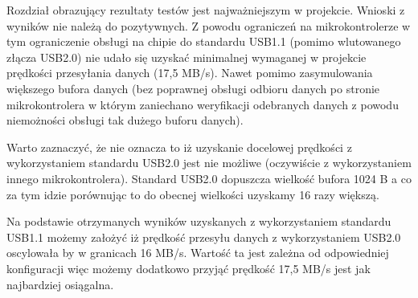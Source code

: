 \documentclass{BscUS}
\begin{document}
Rozdział obrazujący rezultaty testów jest najważniejszym w projekcie. Wnioski z wyników nie należą do pozytywnych. Z powodu ograniczeń na mikrokontrolerze w tym ograniczenie obsługi na chipie do standardu USB1.1 (pomimo wlutowanego złącza USB2.0) nie udało się uzyskać minimalnej wymaganej w projekcie prędkości przesyłania danych (17,5 MB/s). Nawet pomimo zasymulowania większego bufora danych (bez poprawnej obsługi odbioru danych po stronie mikrokontrolera w którym zaniechano weryfikacji odebranych danych z powodu niemożności obsługi tak dużego buforu danych).

Warto zaznaczyć, że nie oznacza to iż uzyskanie docelowej prędkości z wykorzystaniem standardu USB2.0 jest nie możliwe (oczywiście z wykorzystaniem innego mikrokontrolera). Standard USB2.0 dopuszcza wielkość bufora 1024 B a co za tym idzie porównując to do obecnej wielkości uzyskamy 16 razy większą.

Na podstawie otrzymanych wyników uzyskanych z wykorzystaniem standardu USB1.1 możemy założyć iż prędkość przesyłu danych z wykorzystaniem USB2.0 oscylowała by w granicach 16 MB/s. Wartość ta jest zależna od odpowiedniej konfiguracji więc możemy dodatkowo przyjąć prędkość 17,5 MB/s jest jak najbardziej osiągalna.
\end{document}
